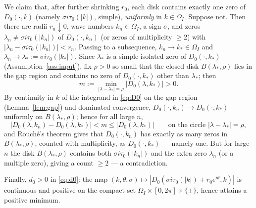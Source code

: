 \documentclass[11pt,a4paper]{amsart}
\theoremstyle{definition}
\theoremstyle{remark}
\begin{document}
We claim that, after further shrinking $r_0$, each disk contains exactly one zero of $D_0(\cdot,k)$ (namely $\sigma i\tau_0(|k|)$, simple), \emph{uniformly} in $k\in\Omega_I$. Suppose not. Then there are radii $r_n\downarrow0$, wave numbers $k_n\in\Omega_I$, a sign $\sigma$, and zeros $\lambda_n\ne\sigma i\tau_0(|k_n|)$ of $D_0(\cdot,k_n)$ (or zeros of multiplicity $\ge2$) with $|\lambda_n-\sigma i\tau_0(|k_n|)|<r_n$. Passing to a subsequence, $k_n\to k_*\in\Omega_I$ and $\lambda_n\to\lambda_*:=\sigma i\tau_0(|k_*|)$. Since $\lambda_*$ is a simple isolated zero of $D_0(\cdot,k_*)$ (Assumption~\ref{ass:input}), fix $\rho>0$ so small that the closed disk $\overline{B(\lambda_*,\rho)}$ lies in the gap region and contains no zero of $D_0(\cdot,k_*)$ other than $\lambda_*$; then
\[
m:=\min_{|\lambda-\lambda_*|=\rho}\bigl|D_0(\lambda,k_*)\bigr|>0 .
\]
By continuity in $k$ of the integrand in \eqref{eq:D0} on the gap region (Lemma~\ref{lem:gap}) and dominated convergence, $D_0(\cdot,k_n)\to D_0(\cdot,k_*)$ uniformly on $\overline{B(\lambda_*,\rho)}$; hence for all large $n$,
\[
\bigl|D_0(\lambda,k_n)-D_0(\lambda,k_*)\bigr|<m\le\bigl|D_0(\lambda,k_*)\bigr|
\qquad\text{on the circle }|\lambda-\lambda_*|=\rho,
\]
and Rouch\'e's theorem gives that $D_0(\cdot,k_n)$ has exactly as many zeros in $B(\lambda_*,\rho)$, counted with multiplicity, as $D_0(\cdot,k_*)$ --- namely one. But for large $n$ the disk $B(\lambda_*,\rho)$ contains both $\sigma i\tau_0(|k_n|)$ and the extra zero $\lambda_n$ (or a multiple zero), giving a count $\ge2$ --- a contradiction.

Finally, $d_0>0$ in \eqref{eq:d0}: the map $(k,\theta,\sigma)\mapsto|D_0(\sigma i\tau_0(|k|)+r_0e^{i\theta},k)|$ is continuous and positive on the compact set $\Omega_I\times[0,2\pi]\times\{\pm\}$, hence attains a positive minimum.

\medskip
\end{document}
